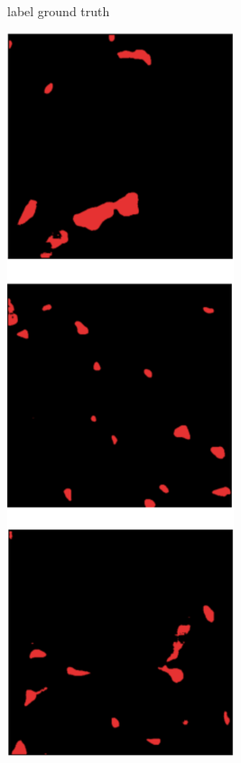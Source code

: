 \begin{figure}[H]
\begin{subfigure}[b]{0.24\textwidth}
		\caption{label ground truth}
		\label{fig:true_label}
	\end{subfigure}
	\hfill
	\begin{subfigure}[b]{0.24\textwidth}
		\centering
		\includegraphics[width=\textwidth]{gambar/bab4/predicted_label.png}

\end{subfigure}
\end{figure}
